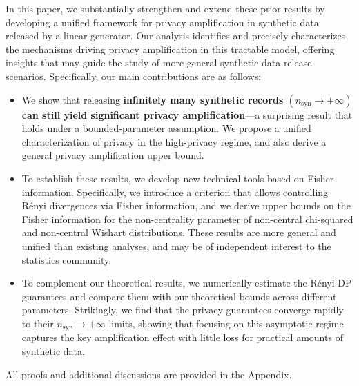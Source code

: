 \documentclass{article}
\theoremstyle{plain}
\theoremstyle{definition}
\theoremstyle{remark}
\begin{document}
In this paper, we substantially strengthen and extend these prior results by developing a unified framework for privacy amplification in synthetic data released by a linear generator.
Our analysis identifies and precisely characterizes the mechanisms driving privacy amplification in this tractable model, offering insights that may guide the study of more general synthetic data release scenarios.
Specifically, our main contributions are as follows:
\begin{itemize}[itemsep=1pt, parsep=2pt, topsep=1pt]
\item %
We show that releasing \textbf{infinitely many synthetic records $(n_{\mathrm{syn}}\to+\infty)$ can still yield significant privacy amplification}—a surprising result that holds under a bounded-parameter assumption. We propose a unified characterization of privacy in the high-privacy regime,
and also derive a general privacy amplification upper bound.
\item To establish these results, we develop new technical tools based on Fisher information. Specifically, we introduce a criterion that allows controlling Rényi divergences via Fisher information, and we derive upper bounds on the Fisher information for the non-centrality parameter of non-central chi-squared and non-central Wishart distributions. These results are more general and unified than existing analyses, and may be of independent interest to the statistics community.
\item To complement our theoretical results, we numerically estimate the Rényi DP guarantees and compare them with our theoretical bounds across different parameters. Strikingly, we find that the privacy guarantees converge rapidly to their $n_{\mathrm{syn}} \to +\infty$ limits, showing that focusing on this asymptotic regime captures the key amplification effect with little loss for practical amounts of synthetic data.

\end{itemize}

All proofs and additional discussions are provided in the Appendix.
\end{document}
